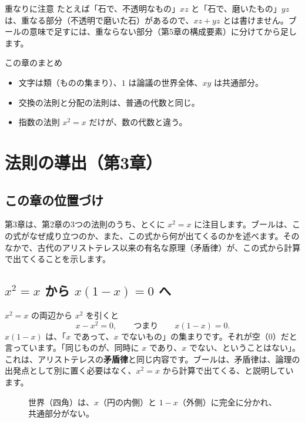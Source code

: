 \documentclass[a4paper,11pt,openany]{ltjsbook}
\begin{document}
\begin{notebox}{重なりに注意}
たとえば「石で、不透明なもの」$xz$ と「石で、磨いたもの」$yz$ は、重なる部分（不透明で磨いた石）があるので、$xz+yz$ とは書けません。ブールの意味で足すには、重ならない部分（第5章の構成要素）に分けてから足します。
\end{notebox}

\begin{pointbox}{この章のまとめ}
\begin{itemize}[leftmargin=*]
\item 文字は類（ものの集まり）、$1$ は論議の世界全体、$xy$ は共通部分。
\item 交換の法則と分配の法則は、普通の代数と同じ。
\item 指数の法則 $x^2=x$ だけが、数の代数と違う。
\end{itemize}
\end{pointbox}

\chapter{法則の導出（第3章）}

\section{この章の位置づけ}

第3章は、第2章の3つの法則のうち、とくに $x^2=x$ に注目します。ブールは、この式がなぜ成り立つのか、また、この式から何が出てくるのかを述べます。そのなかで、古代のアリストテレス以来の有名な原理（矛盾律）が、この式から計算で出てくることを示します。

\section{$x^2=x$ から $x(1-x)=0$ へ}

$x^2=x$ の両辺から $x^2$ を引くと
\[
x-x^2=0,\qquad\text{つまり}\qquad x(1-x)=0 .
\]
$x(1-x)$ は、「$x$ であって、$x$ でないもの」の集まりです。それが空（$0$）だと言っています。「同じものが、同時に $x$ であり、$x$ でない、ということはない」。これは、アリストテレスの\textbf{矛盾律}と同じ内容です。ブールは、矛盾律は、論理の出発点として別に置く必要はなく、$x^2=x$ から計算で出てくる、と説明しています。

\begin{figure}[htbp]
\centering
{}
\caption{世界（四角）は、$x$（円の内側）と $1-x$（外側）に完全に分かれ、共通部分がない。}
\end{figure}
\end{document}
